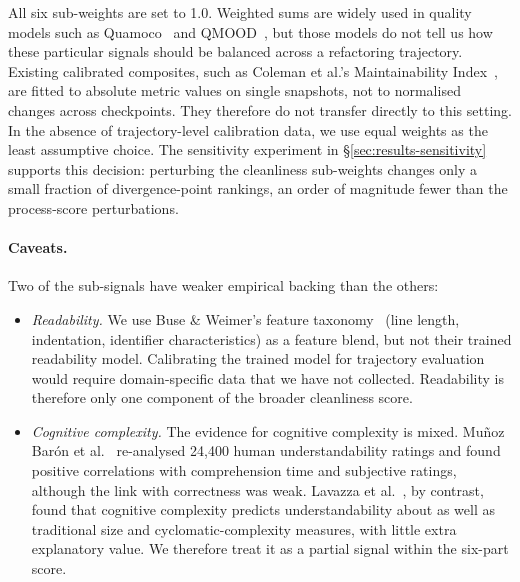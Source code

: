 All six sub-weights are set to 1.0. Weighted sums are widely used in quality models such as Quamoco~\cite{wagner2015quamoco} and QMOOD~\cite{bansiya2002qmood}, but those models do not tell us how these particular signals should be balanced across a refactoring trajectory. Existing calibrated composites, such as Coleman et al.'s Maintainability Index~\cite{coleman1994maintainability}, are fitted to absolute metric values on single snapshots, not to normalised changes across checkpoints. They therefore do not transfer directly to this setting. In the absence of trajectory-level calibration data, we use equal weights as the least assumptive choice. The sensitivity experiment in \S\ref{sec:results-sensitivity} supports this decision: perturbing the cleanliness sub-weights changes only a small fraction of divergence-point rankings, an order of magnitude fewer than the process-score perturbations.

\paragraph{Caveats.}
Two of the sub-signals have weaker empirical backing than the others:
\begin{itemize}
  \item \emph{Readability.} We use Buse \& Weimer's feature taxonomy~\cite{buse2010readability} (line length, indentation, identifier characteristics) as a feature blend, but not their trained readability model. Calibrating the trained model for trajectory evaluation would require domain-specific data that we have not collected. Readability is therefore only one component of the broader cleanliness score.
  \item \emph{Cognitive complexity.} The evidence for cognitive complexity is mixed. Mu{\~n}oz Bar{\'o}n et al.~\cite{munozbaron2020cognitive} re-analysed 24,400 human understandability ratings and found positive correlations with comprehension time and subjective ratings, although the link with correctness was weak. Lavazza et al.~\cite{lavazza2023cognitive}, by contrast, found that cognitive complexity predicts understandability about as well as traditional size and cyclomatic-complexity measures, with little extra explanatory value. We therefore treat it as a partial signal within the six-part score.
\end{itemize}

